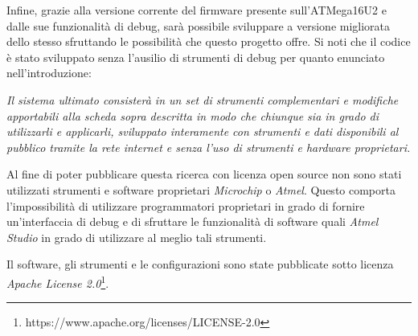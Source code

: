Infine, grazie alla versione corrente del firmware presente sull'ATMega16U2 e dalle sue funzionalità di debug, sarà possibile sviluppare a versione migliorata dello stesso sfruttando le possibilità che questo progetto offre. Si noti che il codice è stato sviluppato senza l'ausilio di strumenti di debug per quanto enunciato nell'introduzione:
\begin{center}
    \textit{Il sistema ultimato consisterà in un set di strumenti complementari e modifiche apportabili alla scheda sopra descritta in modo che chiunque sia in grado di utilizzarli e applicarli, sviluppato interamente con strumenti e dati disponibili al pubblico tramite la rete internet e senza l'uso di strumenti e hardware proprietari.}
\end{center}

Al fine di poter pubblicare questa ricerca con licenza open source non sono stati utilizzati strumenti e software proprietari \textit{Microchip} o \textit{Atmel}. Questo comporta l'impossibilità di utilizzare programmatori proprietari in grado di fornire un'interfaccia di debug e di sfruttare le funzionalità di software quali \textit{Atmel Studio} in grado di utilizzare al meglio tali strumenti.

Il software, gli strumenti e le configurazioni sono state pubblicate sotto licenza \textit{Apache License 2.0}\footnote{https://www.apache.org/licenses/LICENSE-2.0}.
